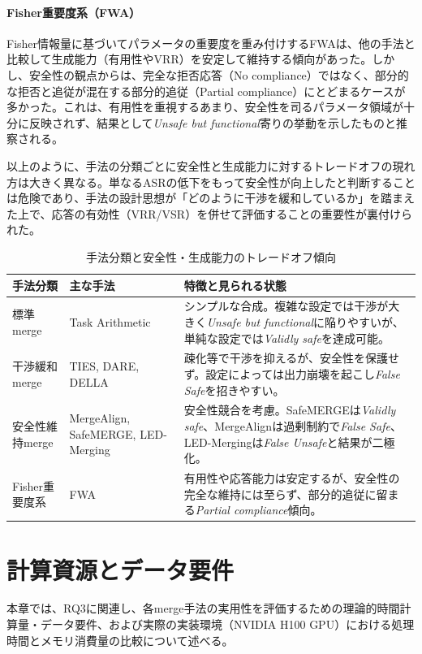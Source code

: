 \documentclass{article}
\begin{document}
\paragraph{Fisher重要度系（FWA）}
Fisher情報量に基づいてパラメータの重要度を重み付けするFWAは、他の手法と比較して生成能力（有用性やVRR）を安定して維持する傾向があった。しかし、安全性の観点からは、完全な拒否応答（No compliance）ではなく、部分的な拒否と追従が混在する部分的追従（Partial compliance）にとどまるケースが多かった。これは、有用性を重視するあまり、安全性を司るパラメータ領域が十分に反映されず、結果として\textit{Unsafe but functional}寄りの挙動を示したものと推察される。

以上のように、手法の分類ごとに安全性と生成能力に対するトレードオフの現れ方は大きく異なる。単なるASRの低下をもって安全性が向上したと判断することは危険であり、手法の設計思想が「どのように干渉を緩和しているか」を踏まえた上で、応答の有効性（VRR/VSR）を併せて評価することの重要性が裏付けられた。

\begin{table}[htbp]
\caption{手法分類と安全性・生成能力のトレードオフ傾向}
\label{tab:method_classification_summary}
\centering
\small
\setlength{\tabcolsep}{3pt}
\renewcommand{\arraystretch}{1.10}
\begin{tabularx}{\textwidth}{
>{\raggedright\arraybackslash}p{2.6cm}
>{\raggedright\arraybackslash}p{3.2cm}
>{\raggedright\arraybackslash}X
}
\toprule
\textbf{手法分類} & \textbf{主な手法} & \textbf{特徴と見られる状態} \\
\midrule
標準merge & Task Arithmetic & シンプルな合成。複雑な設定では干渉が大きく\textit{Unsafe but functional}に陥りやすいが、単純な設定では\textit{Validly safe}を達成可能。 \\
\midrule
干渉緩和merge & TIES, DARE, DELLA & 疎化等で干渉を抑えるが、安全性を保護せず。設定によっては出力崩壊を起こし\textit{False Safe}を招きやすい。 \\
\midrule
安全性維持merge & MergeAlign, SafeMERGE, LED-Merging & 安全性競合を考慮。SafeMERGEは\textit{Validly safe}、MergeAlignは過剰制約で\textit{False Safe}、LED-Mergingは\textit{False Unsafe}と結果が二極化。 \\
\midrule
Fisher重要度系 & FWA & 有用性や応答能力は安定するが、安全性の完全な維持には至らず、部分的追従に留まる\textit{Partial compliance}傾向。 \\
\bottomrule
\end{tabularx}
\end{table}

\section{計算資源とデータ要件}
\label{app:計算資源とデータ要件}
本章では、RQ3に関連し、各merge手法の実用性を評価するための理論的時間計算量・データ要件、および実際の実装環境（NVIDIA H100 GPU）における処理時間とメモリ消費量の比較について述べる。
\end{document}
